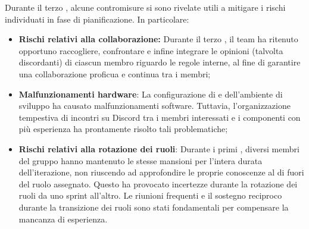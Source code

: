 \vspace{0.5\baselineskip}
\par Durante il terzo , alcune contromisure si sono rivelate utili a mitigare i rischi individuati in fase di pianificazione. In particolare:
\begin{itemize}
  \item \textbf{Rischi relativi alla collaborazione:} Durante il terzo , il team ha ritenuto opportuno raccogliere, confrontare e infine integrare le opinioni (talvolta discordanti) di ciascun membro riguardo le regole interne, al fine di garantire una collaborazione proficua e continua tra i membri;
  \item \textbf{Malfunzionamenti hardware}: La configurazione di  e dell'ambiente di sviluppo ha causato malfunzionamenti software. Tuttavia, l'organizzazione tempestiva di incontri su Discord tra i membri interessati e i componenti con più esperienza ha prontamente risolto tali problematiche;
  \item \textbf{Rischi relativi alla rotazione dei ruoli}: Durante i primi , diversi membri del gruppo hanno mantenuto le stesse mansioni per l'intera durata dell'iterazione, non riuscendo ad approfondire le proprie conoscenze al di fuori del ruolo assegnato. Questo ha provocato incertezze durante la rotazione dei ruoli da uno sprint all'altro. Le riunioni frequenti e il sostegno reciproco durante la transizione dei ruoli sono stati fondamentali per compensare la mancanza di esperienza.
\end{itemize}
